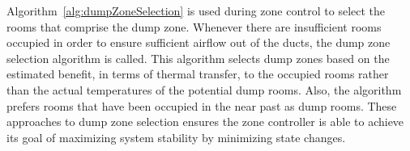 

Algorithm~\ref{alg:dumpZoneSelection} is used during zone control to select the
rooms that comprise the dump zone. Whenever there are insufficient rooms
occupied in order to ensure sufficient airflow out of the ducts, the dump zone
selection algorithm is called. This algorithm selects dump zones based on the
estimated benefit, in terms of thermal transfer, to the occupied rooms rather
than the actual temperatures of the potential dump rooms. Also, the algorithm
prefers rooms that have been occupied in the near past as dump rooms. These
approaches to dump zone selection ensures the zone controller is able to achieve
its goal of maximizing system stability by minimizing state changes.

